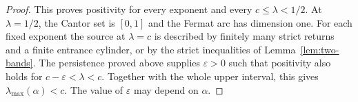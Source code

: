 \begin{proof}
This proves positivity for every exponent and every
$c\le\lambda<1/2$. At $\lambda=1/2$, the Cantor set is $[0,1]$ and
the Fermat arc has dimension one. For each fixed exponent the source
at $\lambda=c$ is described by finitely many strict returns and a
finite entrance cylinder, or by the strict inequalities of
Lemma~\ref{lem:two-bands}. The persistence proved above supplies
$\varepsilon>0$ such that positivity also holds for
$c-\varepsilon<\lambda<c$. Together with the whole upper interval,
this gives $\lambda_{\max}(\alpha)<c$. The value of $\varepsilon$
may depend on $\alpha$.
\end{proof}
